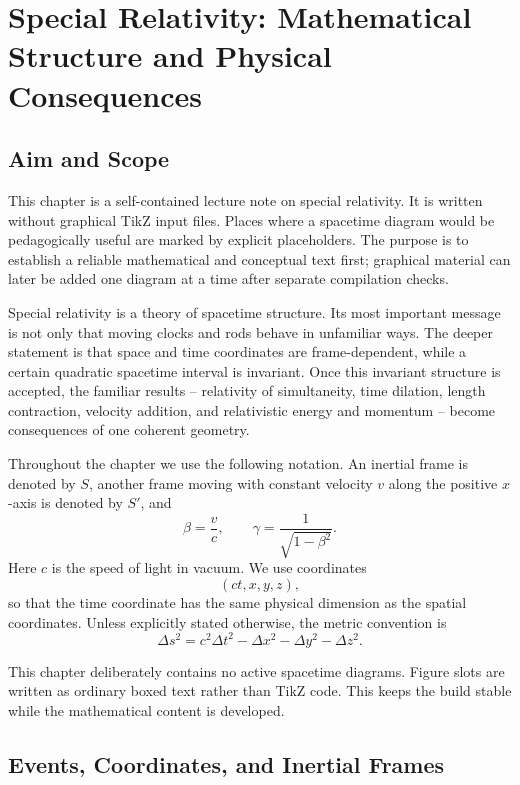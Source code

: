 \chapter{Special Relativity: Mathematical Structure and Physical Consequences}

\section{Aim and Scope}

This chapter is a self-contained lecture note on special relativity.  It is
written without graphical TikZ input files.  Places where a spacetime diagram
would be pedagogically useful are marked by explicit placeholders.  The purpose
is to establish a reliable mathematical and conceptual text first; graphical
material can later be added one diagram at a time after separate compilation
checks.

Special relativity is a theory of spacetime structure.  Its most important
message is not only that moving clocks and rods behave in unfamiliar ways.  The
deeper statement is that space and time coordinates are frame-dependent, while a
certain quadratic spacetime interval is invariant.  Once this invariant
structure is accepted, the familiar results -- relativity of simultaneity, time
dilation, length contraction, velocity addition, and relativistic energy and
momentum -- become consequences of one coherent geometry.

Throughout the chapter we use the following notation.  An inertial frame is
denoted by \(S\), another frame moving with constant velocity \(v\) along the
positive \(x\)-axis is denoted by \(S'\), and
\[
\beta=\frac{v}{c},
\qquad
\gamma=\frac{1}{\sqrt{1-\beta^2}}.
\]
Here \(c\) is the speed of light in vacuum.  We use coordinates
\[
(ct,x,y,z),
\]
so that the time coordinate has the same physical dimension as the spatial
coordinates.  Unless explicitly stated otherwise, the metric convention is
\[
\Delta s^2=c^2\Delta t^2-\Delta x^2-\Delta y^2-\Delta z^2.
\]

\begin{remarkbox}
This chapter deliberately contains no active spacetime diagrams.  Figure slots
are written as ordinary boxed text rather than TikZ code.  This keeps the build
stable while the mathematical content is developed.
\end{remarkbox}

\clearpage

\section{Events, Coordinates, and Inertial Frames}

